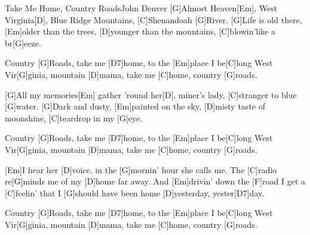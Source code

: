 \documentclass[../main.tex]{subfiles}
\begin{document}
\begin{songwithoutpagebreak}[2]{Take Me Home, Country Roads}{John Denver}{}
[G]Almost Heaven[Em], West Virginia[D], Blue Ridge Mountains, [C]Shenandoah [G]River.
[G]Life is old there, [Em]older than the trees, [D]younger than the mountains, [C]blowin'like a br[G]eeze.

Country [G]Roads, take me [D7]home, to the [Em]place I be[C]long
West Vir[G]ginia, mountain [D]mama, take me [C]home, country [G]roads.

[G]All my memories[Em]  gather 'round her[D], miner's lady, [C]stranger to blue [G]water.
[G]Dark and dusty, [Em]painted on the sky, [D]misty taste of moonshine, [C]teardrop in my [G]eye.

Country [G]Roads, take me [D7]home, to the [Em]place I be[C]long
West Vir[G]ginia, mountain [D]mama, take me [C]home, country [G]roads.

[Em]I hear her [D]voice, in the [G]mornin' hour she calls me.
The [C]radio re[G]minds me of my [D]home far away.
And [Em]drivin' down the [F]road I get a [C]feelin' that I [G]should have been home [D]yesterday, yester[D7]day.

Country [G]Roads, take me [D7]home, to the [Em]place I be[C]long
West Vir[G]ginia, mountain [D]mama, take me [C]home, country [G]roads.
\end{songwithoutpagebreak}
\end{document}
